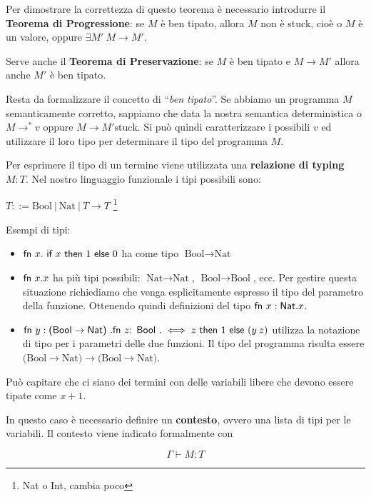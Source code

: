 Per dimostrare la correttezza di questo teorema è necessario introdurre il \textbf{Teorema di Progressione}: se $M$ è ben tipato, allora $M$ non è stuck, cioè o $M$ è un valore, oppure $\exists M' \: M \rightarrow M'$.

Serve anche il \textbf{Teorema di Preservazione}: se $M$ è ben tipato e $M \rightarrow M'$ allora anche $M'$ è ben tipato.

Resta da formalizzare il concetto di ``\textit{ben tipato}''.
Se abbiamo un programma $M$ semanticamente corretto, sappiamo che data la nostra semantica deterministica o $M \rightarrow^* v$ oppure $M \rightarrow M' \text{stuck}$.
Si può quindi caratterizzare i possibili $v$ ed utilizzare il loro tipo per determinare il tipo del programma $M$.

Per esprimere il tipo di un termine viene utilizzata una \textbf{relazione di typing} $M : T$.
Nel nostro linguaggio funzionale i tipi possibili sono:

\begin{center}
$
T ::= \text{Bool} \:|\: \text{Nat} \:|\: T \rightarrow T
$ \footnote{Nat o Int, cambia poco}
\end{center}

Esempi di tipi:
\begin{itemize}
	\item $\fn x.\iif x \then 1 \eelse 0$ ha come tipo $\text{Bool} \rightarrow \text{Nat}$
	\item $\fn x.x$ ha più tipi possibili: $\text{Nat} \rightarrow \text{Nat}$, $\text{Bool} \rightarrow \text{Bool}$, ecc. Per gestire questa situazione richiediamo che venga esplicitamente espresso il tipo del parametro della funzione. Ottenendo quindi definizioni del tipo $\fn x : \text{Nat} .x$.
	\item $\fn y : \text{(Bool}\rightarrow\text{Nat) } . \fn z \text{: Bool }.\iff z \then 1 \eelse (y \: z)$ utilizza la notazione di tipo per i parametri delle due funzioni. Il tipo del programma risulta essere $\text{(Bool}\rightarrow \text{Nat)} \rightarrow \text{(Bool}\rightarrow \text{Nat)}$.
\end{itemize}

Può capitare che ci siano dei termini con delle variabili libere che devono essere tipate come $x + 1$.

In questo caso è necessario definire un \textbf{contesto}, ovvero una lista di tipi per le variabili.
Il contesto viene indicato formalmente con 

$$
\Gamma \vdash M : T
$$

